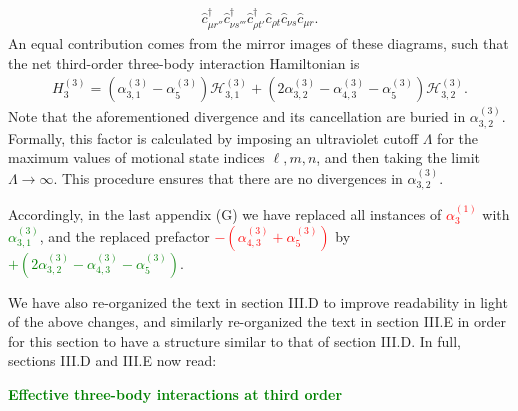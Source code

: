 \documentclass[preprint,showkeys,nofootinbib]{revtex4-1}
\newcommand{\p}[1]{\left(#1\right)} %
\renewcommand{\c}{\hat{c}}
\renewcommand{\H}{\mathcal{H}}
\newcommand{\1}{\mathds{1}}
\newcommand{\red}[1]{\textcolor{red}{#1}}
\newcommand{\green}[1]{\textcolor{green}{#1}}
\begin{document}
\begin{enumerate}
{\begin{align}
      \c_{\mu r''}^\dag \c_{\nu s'''}^\dag \c_{\rho t'}^\dag
      \c_{\rho t} \c_{\nu s} \c_{\mu r}.
      \tag{35}
    \end{align}
    An equal contribution comes from the mirror images of these
    diagrams, such that the net third-order three-body interaction
    Hamiltonian is
    \begin{align}
      H_3^{(3)} = \p{\alpha_{3,1}^{(3)} - \alpha_5^{(3)}} \H_{3,1}^{(3)}
      + \p{2\alpha_{3,2}^{(3)} - \alpha_{4,3}^{(3)} - \alpha_5^{(3)}}
      \H_{3,2}^{(3)}.
      \tag{36}
    \end{align}
    Note that the aforementioned divergence and its cancellation are
    buried in $\alpha_{3,2}^{(3)}$.  Formally, this factor is
    calculated by imposing an ultraviolet cutoff $\Lambda$ for the
    maximum values of motional state indices $\ell,m,n$, and then
    taking the limit $\Lambda\to\infty$.  This procedure ensures that
    there are no divergences in $\alpha_{3,2}^{(3)}$.}

  Accordingly, in the last appendix (G) we have replaced all instances
  of \red{$\alpha_3^{(1)}$} with \green{$\alpha_{3,1}^{(3)}$}, and the
  replaced prefactor \red{$-\p{\alpha_{4,3}^{(3)}+\alpha_5^{(3)}}$} by
  \green{$+ \p{2\alpha_{3,2}^{(3)} - \alpha_{4,3}^{(3)} -
      \alpha_5^{(3)}}$}.

  We have also re-organized the text in section III.D to improve
  readability in light of the above changes, and similarly
  re-organized the text in section III.E in order for this section to
  have a structure similar to that of section III.D.  In full,
  sections III.D and III.E now read:

  \green{{\bf Effective three-body interactions at third order}}


\end{enumerate}
\end{document}
